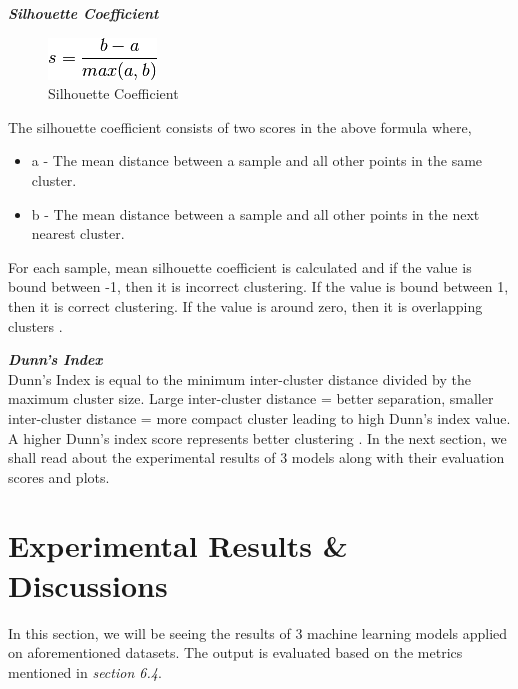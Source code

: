 \documentclass[format=sigconf]{acmart}
\begin{document}
\textit{\textbf{Silhouette Coefficient}}\\
\begin{figure}[H]
    \centering
    \includegraphics[scale=0.60]{images/silhouette_coefficient.png}
    \caption{Silhouette Coefficient}
    \label{fig:silc}
\end{figure}

The silhouette coefficient consists of two scores in the above formula where, 
\begin{itemize}
    \item a - The mean distance between a sample and all other points in the same cluster.
    \item b - The mean distance between a sample and all other points in the next nearest cluster.
\end{itemize}
For each sample, mean silhouette coefficient is calculated and if the value is bound between -1, then it is incorrect clustering. If
the value is bound between 1, then it is correct clustering. If the value is around zero, then it is overlapping clusters \cite{evaluationmetric}.

\textit{\textbf{Dunn's Index}} \\
Dunn’s Index is equal to the minimum inter-cluster distance divided by the maximum cluster size. 
Large inter-cluster distance = better separation, smaller inter-cluster distance = more compact cluster leading to high Dunn's index
value. A higher Dunn’s index score represents better clustering \cite{evaluationmetric}. In the next section, we shall read about the experimental
results of 3 models along with their evaluation scores and plots.

\section{Experimental Results \& Discussions}
In this section, we will be seeing the results of 3 machine learning models applied on aforementioned datasets. The output is 
evaluated based on the metrics mentioned in \textit{section 6.4}.
\end{document}
